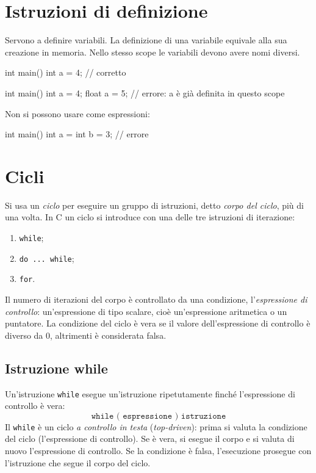 \documentclass[11pt,a4paper]{article}
\begin{document}
\section{Istruzioni di definizione}

Servono a definire variabili. La definizione di una variabile equivale alla sua creazione in memoria. Nello stesso scope le variabili devono avere nomi diversi.

\begin{codice}
int main() {
    int a = 4;      // corretto
}
\end{codice}
\begin{codice}
int main() {
    int a = 4;
    float a = 5;    // errore: a è già definita in questo scope
}
\end{codice}
Non si possono usare come espressioni:
\begin{codice}
int main() {
    int a = int b = 3;    // errore
}
\end{codice}

\section{Cicli}

Si usa un \emph{ciclo} per eseguire un gruppo di istruzioni, detto \emph{corpo del ciclo}, più di una volta. In C un ciclo si introduce con una delle tre istruzioni di iterazione:
\begin{enumerate}
    \item \lstinline|while|;
    \item \lstinline|do ... while|;
    \item \lstinline|for|.
\end{enumerate}
Il numero di iterazioni del corpo è controllato da una condizione, l'\emph{espressione di controllo}: un'espressione di tipo scalare, cioè un'espressione aritmetica o un puntatore. La condizione del ciclo è vera se il valore dell'espressione di controllo è diverso da $0$, altrimenti è considerata falsa.

\subsection{Istruzione while}

Un'istruzione \lstinline|while| esegue un'istruzione ripetutamente finché l'espressione di controllo è vera:
\[
\texttt{while ( espressione ) istruzione}
\]
Il \lstinline|while| è un ciclo \emph{a controllo in testa} (\emph{top-driven}): prima si valuta la condizione del ciclo (l'espressione di controllo). Se è vera, si esegue il corpo e si valuta di nuovo l'espressione di controllo. Se la condizione è falsa, l'esecuzione prosegue con l'istruzione che segue il corpo del ciclo.
\end{document}
